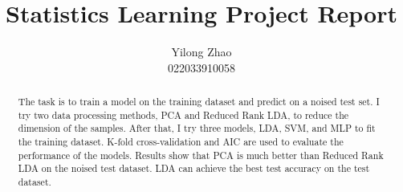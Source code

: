 \documentclass[10pt,onecolumn,letterpaper]{article}
\begin{document}
\title{Statistics Learning Project Report}

\author{Yilong Zhao\\
022033910058
}
\maketitle

\begin{abstract}
   The task is to train a model on the training dataset and predict on a noised test set.
   I try two data processing methods, PCA and Reduced Rank LDA, to reduce the dimension of the samples.
   After that, I try three models, LDA, SVM, and MLP to fit the training dataset.
   K-fold cross-validation and AIC are used to evaluate the performance of the models.
   Results show that PCA is much better than Reduced Rank LDA on the noised test dataset.
   LDA can achieve the best test accuracy on the test dataset.
\end{abstract}
\end{document}
